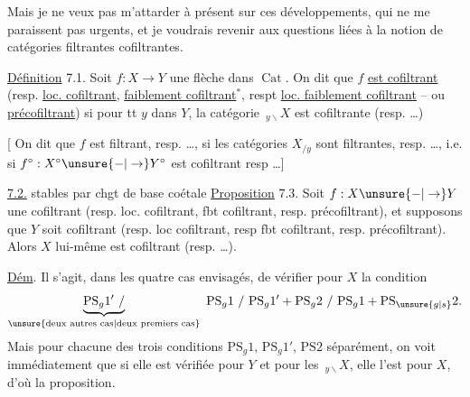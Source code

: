 Mais je ne veux pas m'attarder à présent sur
ces développements, qui ne me paraissent pas
urgents, et je voudrais revenir aux questions
liées à la notion de catégories filtrantes 
cofiltrantes.

\uline{Définition} 7.1. Soit $f:X\to Y$ une flèche dans $\operatorname{Cat}$.
On dit que $f$ \uline{est cofiltrant} (resp. \uline{loc. cofiltrant},
\uline{faiblement cofiltrant}$^{*}$, respt \uline{loc. faiblement cofiltrant}
-- ou \uline{précofiltrant}) si pour tt $y$ dans
$Y$, la catégorie  $\,{}_{y\backslash}X$ est cofiltrante (resp. \ldots)

[ On dit que $f$ est filtrant, resp. \ldots, si les
catégories $X_{/y}$ sont filtrantes, resp. \ldots, i.e.
si $f^\circ:X^\circ\unsure{-|\to}Y^\circ$ est cofiltrant resp \ldots]

 \uline{ 7.2.}  stables par chgt de base coétale
\uline{Proposition} 7.3. Soit $f:X\unsure{-|\to}Y$ une 
cofiltrant (resp. loc. cofiltrant,  fbt cofiltrant,
resp.  précofiltrant), et supposons
que $Y$ soit cofiltrant (resp. loc cofiltrant,
resp fbt cofiltrant, resp. précofiltrant). Alors
$X$ lui-même est cofiltrant (resp. \ldots).

\uline{Dém}. Il s'agit, dans les quatre cas
envisagés, de vérifier pour $X$ la condition
\[
\underbrace{\mathrm{PS}_g1'\ /}_{\text{\unsure{deux autres cas|deux premiers cas}}}
\ \mathrm{PS}_g1\ /\ \mathrm{PS}_g1'+\mathrm{PS}_g2\ /\ \mathrm{PS}_g1+\mathrm{PS}_{\unsure{g|s}}2.
\]
Mais
pour chacune des trois conditions $\mathrm{PS}_g1$, $\mathrm{PS}_g1'$, $\mathrm{PS}2$
séparément, on voit immédiatement que si
elle est vérifiée pour $Y$ et pour les $\,{}_{y\backslash}X$,
elle l'est pour $X$, d'où la proposition.

